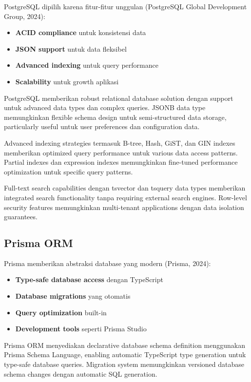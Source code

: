 PostgreSQL dipilih karena fitur-fitur unggulan (PostgreSQL Global Development Group, 2024):

\begin{itemize}
\item \textbf{ACID compliance} untuk konsistensi data
\item \textbf{JSON support} untuk data fleksibel
\item \textbf{Advanced indexing} untuk query performance
\item \textbf{Scalability} untuk growth aplikasi
\end{itemize}

PostgreSQL memberikan robust relational database solution dengan support untuk advanced data types dan complex queries. JSONB data type memungkinkan flexible schema design untuk semi-structured data storage, particularly useful untuk user preferences dan configuration data.

Advanced indexing strategies termasuk B-tree, Hash, GiST, dan GIN indexes memberikan optimized query performance untuk various data access patterns. Partial indexes dan expression indexes memungkinkan fine-tuned performance optimization untuk specific query patterns.

Full-text search capabilities dengan tsvector dan tsquery data types memberikan integrated search functionality tanpa requiring external search engines. Row-level security features memungkinkan multi-tenant applications dengan data isolation guarantees.

\subsection{Prisma ORM}

Prisma memberikan abstraksi database yang modern (Prisma, 2024):

\begin{itemize}
\item \textbf{Type-safe database access} dengan TypeScript
\item \textbf{Database migrations} yang otomatis
\item \textbf{Query optimization} built-in
\item \textbf{Development tools} seperti Prisma Studio
\end{itemize}

Prisma ORM menyediakan declarative database schema definition menggunakan Prisma Schema Language, enabling automatic TypeScript type generation untuk type-safe database queries. Migration system memungkinkan versioned database schema changes dengan automatic SQL generation.

